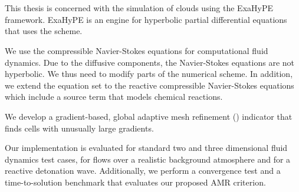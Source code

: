 \chapter{\abstractname}
This thesis is concerned with the simulation of clouds using the ExaHyPE framework.
ExaHyPE is an engine for hyperbolic partial differential equations that uses the \aderdg{} scheme.

We use the compressible Navier-Stokes equations for computational fluid dynamics.
Due to the diffusive components, the Navier-Stokes equations are not hyperbolic.
We thus need to modify parts of the numerical scheme.
In addition, we extend the equation set to the reactive compressible Navier-Stokes equations which include a source term that models chemical reactions.

We develop a gradient-based, global adaptive mesh refinement (\amr{}) indicator that finds cells with unusually large gradients.

Our implementation is evaluated for standard two and three dimensional fluid dynamics test cases, for flows over a realistic background atmosphere and for a reactive detonation wave.
Additionally, we perform a convergence test and a time-to-solution benchmark that evaluates our proposed AMR criterion.

